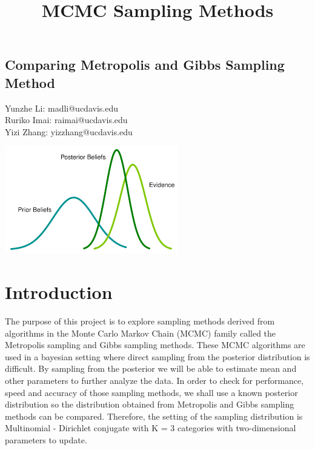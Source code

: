 \documentclass[11pt,a4paper]{article}
\begin{document}
\title{MCMC Sampling Methods}
\pagestyle{fancy}

{
\fancyhf{}
\cfoot{\thepage}
}

\vspace*{\fill}
\begin{center}
\subsection*{ 
\huge Comparing Metropolis and Gibbs Sampling Method
}
\end{center}

\begin{center}
Yunzhe Li: madli@ucdavis.edu \\
Ruriko Imai: raimai@ucdavis.edu \\
Yizi Zhang: yizzhang@ucdavis.edu
\end{center}
\bigskip
\bigskip
\bigskip
\bigskip
\bigskip
\bigskip
\bigskip
\bigskip
\bigskip
\bigskip
\bigskip
\bigskip


\begin{center}
\includegraphics[scale=1.5]{images/cover.png}
\end{center}
\vspace*{\fill}
\newpage

\section*{Introduction}
The purpose of this project is to explore sampling methods derived from algorithms in the Monte Carlo Markov Chain (MCMC) family called the Metropolis sampling and Gibbs sampling methods. These MCMC algorithms are used in a bayesian setting where direct sampling from the posterior distribution is difficult. By sampling from the posterior we will be able to estimate mean and other parameters to further analyze the data. In order to check for performance, speed and accuracy of those sampling methods, we shall use a known posterior distribution so the distribution obtained from Metropolis and Gibbs sampling methods can be compared. Therefore, the  setting of the sampling distribution is Multinomial - Dirichlet conjugate with K = 3 categories with two-dimensional parameters to update. 
\end{document}
